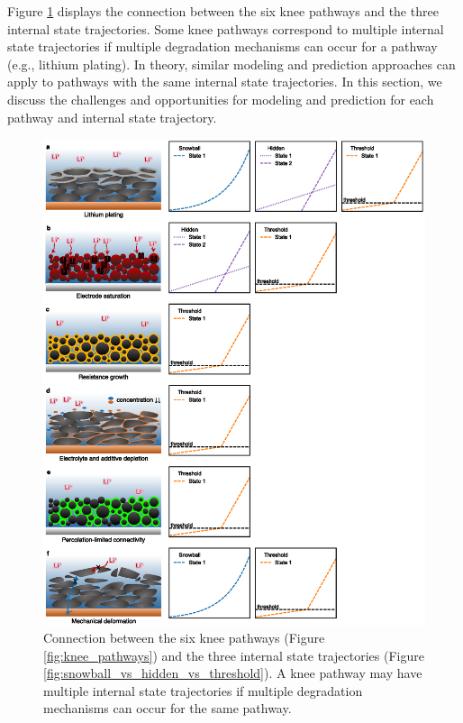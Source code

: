 \documentclass[journal=jpclcd,manuscript=article]{achemso}
\begin{document}
Figure \ref{fig:summary} displays the connection between the six knee pathways and the three internal state trajectories. Some knee pathways correspond to multiple internal state trajectories if multiple degradation mechanisms can occur for a pathway (e.g., lithium plating). In theory, similar modeling and prediction approaches can apply to pathways with the same internal state trajectories. In this section, we discuss the challenges and opportunities for modeling and prediction for each pathway and internal state trajectory.

\begin{figure}[p]
    \centering
    \includegraphics[scale=0.85]{figures/pathway_trajectory_summary.eps}
    \caption{
    Connection between the six knee pathways (Figure \ref{fig:knee_pathways}) and the three internal state trajectories (Figure \ref{fig:snowball_vs_hidden_vs_threshold}).
    A knee pathway may have multiple internal state trajectories if multiple degradation mechanisms can occur for the same pathway.
    }
    \label{fig:summary}
\end{figure}
\end{document}
